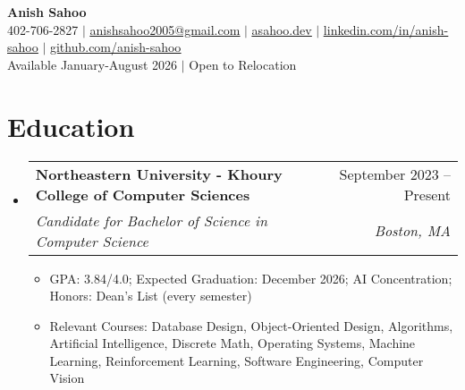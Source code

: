 \documentclass[letterpaper,11pt]{article}
\makeatletter
\newcommand{\resumeItem}[1]{
  \item\small{
    {#1 \vspace{-2pt}}
  }
}
\newcommand{\resumeSubheading}[4]{
  \vspace{-2pt}\item
    \begin{tabular*}{0.97\textwidth}[t]{l@{\extracolsep{\fill}}r}
      \textbf{#1} & #2 \\
      \textit{\small#3} & \textit{\small #4} \\
    \end{tabular*}\vspace{-7pt}
}
\newcommand{\resumeSubHeadingListStart}{\begin{itemize}[leftmargin=0.15in, label={}]}
\newcommand{\resumeSubHeadingListEnd}{\end{itemize}}
\newcommand{\resumeItemListStart}{\begin{itemize}}
\newcommand{\resumeItemListEnd}{\end{itemize}\vspace{-5pt}}
\makeatother
\begin{document}

\begin{center}
    \textbf{\Huge Anish Sahoo} \\ \vspace{1pt}
    \small 402-706-2827 
    $|$ 
    \href{mailto:anishsahoo2005@gmail.com}{\underline{anishsahoo2005@gmail.com}} $|$ 
    \href{https://asahoo.dev}{\underline{asahoo.dev}}
    $|$
    \href{https://linkedin.com/in/anish-sahoo}{\underline{linkedin.com/in/anish-sahoo}} $|$
    \href{https://github.com/anish-sahoo}{\underline{github.com/anish-sahoo}} \vspace{1pt} \\
    Available January-August 2026 $|$ Open to Relocation%
\end{center}


\section{Education}
  \resumeSubHeadingListStart
    \resumeSubheading
      {Northeastern University - Khoury College of Computer Sciences}{September 2023 -- Present}
      {Candidate for Bachelor of Science in Computer Science}{Boston, MA}
    \resumeItemListStart
        \resumeItem{GPA: 3.84/4.0; Expected Graduation: December 2026; AI Concentration; Honors: Dean's List (every semester)}
        \resumeItem{Relevant Courses: Database Design, Object-Oriented Design, Algorithms, Artificial Intelligence, Discrete Math, Operating Systems, Machine Learning, Reinforcement Learning, Software Engineering, Computer Vision}
    \resumeItemListEnd
  \resumeSubHeadingListEnd
\end{document}

